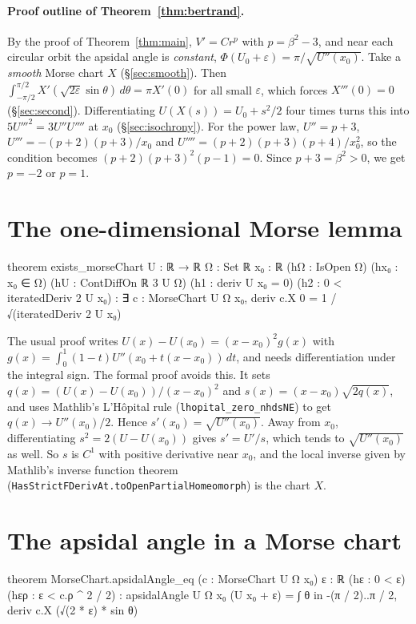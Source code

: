 \documentclass[11pt]{article}
\theoremstyle{remark}
\begin{document}
\paragraph{Proof outline of Theorem~\ref{thm:bertrand}.} By the proof of Theorem~\ref{thm:main},
$V'=Cr^p$ with $p=\beta^2-3$, and near each circular orbit the apsidal angle is \emph{constant},
$\Phi(U_0+\varepsilon)=\pi/\sqrt{U''(x_0)}$. Take a \emph{smooth} Morse chart $X$
(\S\ref{sec:smooth}). Then $\int_{-\pi/2}^{\pi/2}X'(\sqrt{2\varepsilon}\sin\theta)\,d\theta=\pi X'(0)$
for all small $\varepsilon$, which forces $X'''(0)=0$ (\S\ref{sec:second}). Differentiating
$U(X(s))=U_0+s^2/2$ four times turns this into $5U'''^2=3U''U''''$ at $x_0$
(\S\ref{sec:isochrony}). For the power law, $U''=p+3$, $U'''=-(p+2)(p+3)/x_0$ and
$U''''=(p+2)(p+3)(p+4)/x_0^2$, so the condition becomes $(p+2)(p+3)^2(p-1)=0$. Since $p+3=\beta^2>0$,
we get $p=-2$ or $p=1$.

\section{The one-dimensional Morse lemma}\label{sec:morse}

\begin{lean}
theorem exists_morseChart {U : ℝ → ℝ} {Ω : Set ℝ} {x₀ : ℝ} (hΩ : IsOpen Ω) (hx₀ : x₀ ∈ Ω)
    (hU : ContDiffOn ℝ 3 U Ω) (h1 : deriv U x₀ = 0) (h2 : 0 < iteratedDeriv 2 U x₀) :
    ∃ c : MorseChart U Ω x₀, deriv c.X 0 = 1 / √(iteratedDeriv 2 U x₀)
\end{lean}

The usual proof writes $U(x)-U(x_0)=(x-x_0)^2g(x)$ with
$g(x)=\int_0^1(1-t)U''(x_0+t(x-x_0))\,dt$, and needs differentiation under the integral sign. The
formal proof avoids this. It sets $q(x)=(U(x)-U(x_0))/(x-x_0)^2$ and
$s(x)=(x-x_0)\sqrt{2q(x)}$, and uses Mathlib's L'Hôpital rule (\texttt{lhopital\_zero\_nhdsNE}) to
get $q(x)\to U''(x_0)/2$. Hence $s'(x_0)=\sqrt{U''(x_0)}$. Away from $x_0$, differentiating
$s^2=2(U-U(x_0))$ gives $s'=U'/s$, which tends to $\sqrt{U''(x_0)}$ as well. So $s$ is $C^1$ with
positive derivative near $x_0$, and the local inverse given by Mathlib's inverse function theorem
(\texttt{HasStrictFDerivAt.toOpenPartialHomeomorph}) is the chart $X$.

\section{The apsidal angle in a Morse chart}\label{sec:chart}

\begin{lean}
theorem MorseChart.apsidalAngle_eq (c : MorseChart U Ω x₀) {ε : ℝ} (hε : 0 < ε)
    (hερ : ε < c.ρ ^ 2 / 2) :
    apsidalAngle U Ω x₀ (U x₀ + ε) =
      ∫ θ in -(π / 2)..π / 2, deriv c.X (√(2 * ε) * sin θ)
\end{lean}
\end{document}
